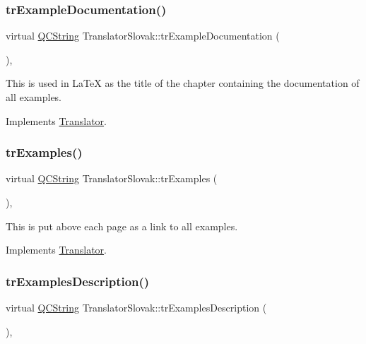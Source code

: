 \subsubsection{\texorpdfstring{trExampleDocumentation()}{trExampleDocumentation()}}
{\footnotesize\ttfamily virtual \mbox{\hyperlink{class_q_c_string}{Q\+C\+String}} Translator\+Slovak\+::tr\+Example\+Documentation (\begin{DoxyParamCaption}{ }\end{DoxyParamCaption})\hspace{0.3cm}{\ttfamily [inline]}, {\ttfamily [virtual]}}

This is used in La\+TeX as the title of the chapter containing the documentation of all examples. 

Implements \mbox{\hyperlink{class_translator}{Translator}}.

\mbox{\label{class_translator_slovak_a2be2ee1b3c8d37b764d984c2b0fcb59f}} 
\subsubsection{\texorpdfstring{trExamples()}{trExamples()}}
{\footnotesize\ttfamily virtual \mbox{\hyperlink{class_q_c_string}{Q\+C\+String}} Translator\+Slovak\+::tr\+Examples (\begin{DoxyParamCaption}{ }\end{DoxyParamCaption})\hspace{0.3cm}{\ttfamily [inline]}, {\ttfamily [virtual]}}

This is put above each page as a link to all examples. 

Implements \mbox{\hyperlink{class_translator}{Translator}}.

\mbox{\label{class_translator_slovak_a5fcb65e73cc3d0c1e1bbda095cd9a396}} 
\subsubsection{\texorpdfstring{trExamplesDescription()}{trExamplesDescription()}}
{\footnotesize\ttfamily virtual \mbox{\hyperlink{class_q_c_string}{Q\+C\+String}} Translator\+Slovak\+::tr\+Examples\+Description (\begin{DoxyParamCaption}{ }\end{DoxyParamCaption})\hspace{0.3cm}{\ttfamily [inline]}, {\ttfamily [virtual]}}

